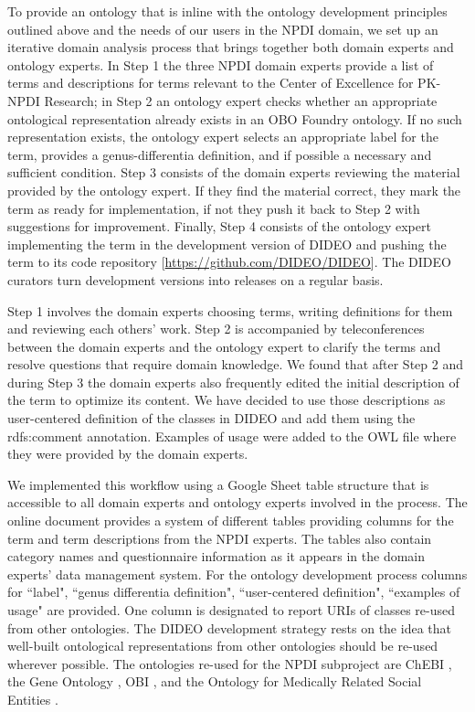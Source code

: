 \documentclass{bmcart}
\begin{document}
To provide an ontology that is inline with the ontology development principles outlined above and the needs of our users in the NPDI domain, we set up an iterative domain analysis process that brings together both domain experts and ontology experts.
In Step 1 the three NPDI domain experts provide a list of terms and descriptions for terms relevant to the Center of Excellence for PK-NPDI Research; in Step 2 an ontology expert checks whether an appropriate ontological representation already exists in an OBO Foundry ontology.
If no such representation exists, the ontology expert selects an appropriate label for the term, provides a genus-differentia definition, and if possible a necessary and sufficient condition.
Step 3 consists of the domain experts reviewing the material provided by the ontology expert.
If they find the material correct, they mark the term as ready for implementation, if not they push it back to Step 2 with suggestions for improvement.
Finally, Step 4 consists of the ontology expert implementing the term in the development version of DIDEO and pushing the term to its code repository [\url{https://github.com/DIDEO/DIDEO}].
The DIDEO curators turn development versions into releases on a regular basis.

Step 1 involves the domain experts choosing terms, writing definitions for them and reviewing each others' work.
Step 2 is accompanied by teleconferences between the domain experts and the ontology expert to clarify the terms and resolve questions that require domain knowledge.
We found that after Step 2 and during Step 3 the domain experts also frequently edited the initial description of the term to optimize its content.
We have decided to use those descriptions as user-centered definition of the classes in DIDEO and add them using the rdfs:comment annotation.
Examples of usage were added to the OWL file where they were provided by the domain experts.

We implemented this workflow using a Google Sheet table structure that is accessible to all domain experts and ontology experts involved in the process.
The online document provides a system of different tables providing columns for the term and term descriptions from the NPDI experts.
The tables also contain category names and questionnaire information as it appears in the domain experts’ data management system.
For the ontology development process columns for ``label", ``genus differentia definition", ``user-centered definition", ``examples of usage" are provided.
One column is designated to report URIs of classes re-used from other ontologies.
The DIDEO development strategy rests on the idea that well-built ontological representations from other ontologies should be re-used wherever possible.
The ontologies re-used for the NPDI subproject are ChEBI \cite{Degtyarenko}, the Gene Ontology \cite{Ashburner2001}, OBI \cite{Bandrowski2016}, and the Ontology for Medically Related Social Entities \cite{Hicks2016}.
\end{document}
